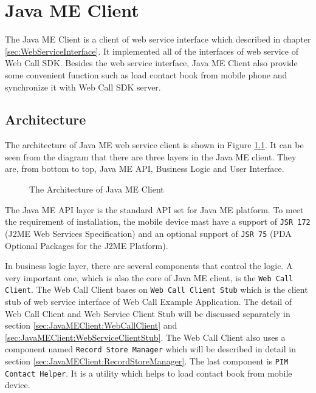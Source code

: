 
\chapter{Java ME Client}
\label{sec:JavaMEClient}

The Java ME Client is a client of web service interface which described in chapter \nolinebreak \ref{sec:WebServiceInterface}. It implemented all of the interfaces of web service of Web Call SDK. Besides the web service interface, Java ME Client also provide some convenient function such as load contact book from mobile phone and synchronize it with Web Call SDK server. 

\section{Architecture}
\label{sec:JavaMEClient:Architecture}

The architecture of Java ME web service client is shown in Figure \nolinebreak \ref{fig:TheArchitectureOfJavaMEClient}. It can be seen from the diagram that there are three layers in the Java ME client. They are, from bottom to top, Java ME API, Business Logic and User Interface. 

\begin{figure}[!hbtp]
\centering
{}
\caption{The Architecture of Java ME Client}
\label{fig:TheArchitectureOfJavaMEClient}
\end{figure}

The Java ME API layer is the standard API set for Java ME platform. To meet the requirement of installation, the mobile device mast have a support of \texttt{JSR 172} (J2ME\texttrademark{} Web Services Specification)\cite{JSR172} and an optional support of \texttt{JSR 75} (PDA Optional Packages for the J2ME Platform)\cite{JSR75}. 

In business logic layer, there are several components that control the logic. A very important one, which is also the core of Java ME client, is the \texttt{Web Call Client}. The Web Call Client bases on \texttt{Web Call Client Stub} which is the client stub of web service interface of Web Call Example Application. The detail of Web Call Client and Web Service Client Stub will be discussed separately in section \ref{sec:JavaMEClient:WebCallClient} and \ref{sec:JavaMEClient:WebServiceClientStub}. The Web Call Client also uses a component named \texttt{Record Store Manager} which will be described in detail in section \ref{sec:JavaMEClient:RecordStoreManager}. The last component is \texttt{PIM Contact Helper}. It is a utility which helps to load contact book from mobile device.

